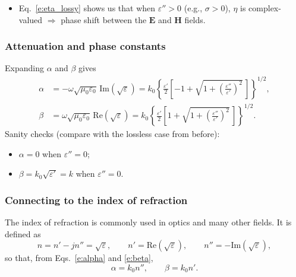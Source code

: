 \documentclass[11pt, oneside]{article}
\begin{document}
\begin{itemize}
\begin{itemize}
		\item $\alpha$ attenuates: the field amplitude decays by $1/e$ over a distance $\delta_s = 1/\alpha$, where $\delta_s$ is the \emph{skin depth}.
		\item The power (intensity) decays by $1/e$ over the \emph{penetration depth} $\delta_p = 1/(2\alpha)$, so $\delta_s = 2\delta_p$.
	\end{itemize}
	\item Eq.~\eqref{e:eta_lossy} shows us that when $\varepsilon'' > 0$ (e.g., $\sigma > 0$), $\eta$ is complex-valued $\Rightarrow$ phase shift between the $\mathbf{E}$ and $\mathbf{H}$ fields.
\end{itemize}

\subsubsection{Attenuation and phase constants}

Expanding $\alpha$ and $\beta$ gives
\begin{align}
	\label{e:alpha}
	\alpha &= -\omega\sqrt{\mu_0\varepsilon_0}\,\mathrm{Im}\left(\sqrt{\varepsilon}\right)
	= k_0\left\{\frac{\varepsilon'}{2}\left[-1 + \sqrt{1 + \left(\frac{\varepsilon''}{\varepsilon'}\right)^2}\,\right]\right\}^{1/2}, \\
	\label{e:beta}
	\beta &= \omega\sqrt{\mu_0\varepsilon_0}\,\mathrm{Re}\left(\sqrt{\varepsilon}\right)
	= k_0\left\{\frac{\varepsilon'}{2}\left[1 + \sqrt{1 + \left(\frac{\varepsilon''}{\varepsilon'}\right)^2}\,\right]\right\}^{1/2}.
\end{align}
Sanity checks (compare with the lossless case from before):
\begin{itemize}
	\item $\alpha = 0$ when $\varepsilon'' = 0$;
	\item $\beta = k_0\sqrt{\varepsilon'} = k$ when $\varepsilon'' = 0$.
\end{itemize}

\subsubsection{Connecting to the index of refraction}
\label{s:index}

The index of refraction is commonly used in optics and many other fields. It is defined as
\begin{equation}
	n = n' - jn'' = \sqrt{\varepsilon},
	\qquad
	n' = \mathrm{Re}\left(\sqrt{\varepsilon}\right),
	\qquad
	n'' = -\mathrm{Im}\left(\sqrt{\varepsilon}\right),
\end{equation}
so that, from Eqs.~\eqref{e:alpha} and \eqref{e:beta},
\begin{equation}
	\alpha = k_0 n'', \qquad \beta = k_0 n'.
\end{equation}
\end{document}

